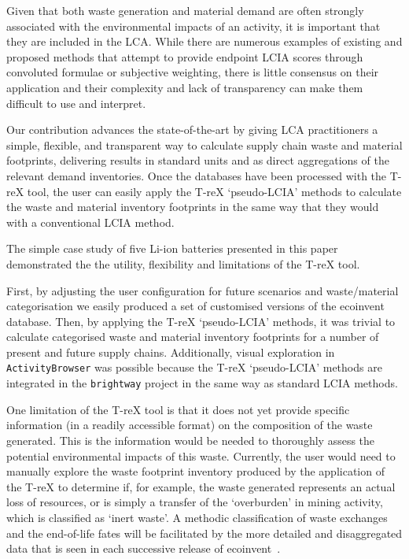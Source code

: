 Given that both waste generation and material demand are often strongly associated with the environmental impacts of an activity, it is important that they are included in the LCA. While there are numerous examples of existing and proposed methods that attempt to provide endpoint LCIA scores through convoluted formulae or subjective weighting, there is little consensus on their application and their complexity and lack of transparency can make them difficult to use and interpret.

Our contribution advances the state-of-the-art by giving LCA practitioners a simple, flexible, and transparent way to calculate supply chain waste and material footprints, delivering results in standard units and as direct aggregations of the relevant demand inventories. Once the databases have been processed with the T-reX tool, the user can  easily apply the T-reX `pseudo-LCIA' methods to calculate the waste and material inventory footprints in the same way that they would with a conventional LCIA method.

The simple case study of five Li-ion batteries presented in this paper demonstrated the the utility, flexibility and limitations of the T-reX tool. 

First, by adjusting the user configuration for future scenarios and waste/material categorisation we easily produced a set of customised versions of the ecoinvent database. Then, by applying the T-reX `pseudo-LCIA' methods, it was trivial to calculate categorised waste and material inventory footprints for a number of present and future supply chains. Additionally, visual exploration in \texttt{ActivityBrowser} was possible because the T-reX `pseudo-LCIA' methods are integrated in the \texttt{brightway} project in the same way as standard LCIA methods.

One limitation of the T-reX tool is that it does not yet provide specific information (in a readily accessible format) on the composition of the waste generated. This is the information would be needed to thoroughly assess the potential environmental impacts of this waste. Currently, the user would need to manually explore the waste footprint inventory produced by the application of the T-reX to determine if, for example, the waste generated represents an actual loss of resources, or is simply a transfer of the `overburden' in mining activity, which is classified as `inert waste'. A methodic classification of waste exchanges and the end-of-life fates will be facilitated by the more detailed and disaggregated data that is seen in each successive release of ecoinvent~\citep{fitzgerald2023ecoinventdocumentation}.

